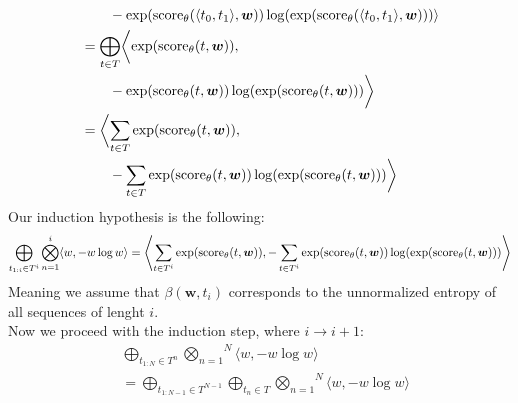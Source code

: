 \documentclass[a4paper,12pt]{ETHexercise}
\begin{document}
\begin{question}
\begin{subquestion}
\begin{align}
			                                                                                       & \qquad -\exp(\text{score}_{\theta}(\langle t_0, t_1 \rangle, \boldsymbol{w})) \log(\exp(\text{score}_{\theta}(\langle t_0, t_1 \rangle, \boldsymbol{w}))) \rangle               \\
			                                                                                       & = \bigoplus_{t \in T} \biggl< \exp(\text{score}_{\theta}(t, \boldsymbol{w})),                         \nonumber \\
			                                                                                       & \qquad  -\exp(\text{score}_{\theta}(t, \boldsymbol{w})) \log(\exp(\text{score}_{\theta}(t, \boldsymbol{w}))) \biggr>                          \\
			                                                                                       & = \biggl< \sum_{t \in T} \exp(\text{score}_{\theta}(t, \boldsymbol{w})),                              \nonumber \\
			                                                                                       & \qquad -\sum_{t \in T} \exp(\text{score}_{\theta}(t, \boldsymbol{w})) \log(\exp(\text{score}_{\theta}(t, \boldsymbol{w}))) \biggr>
		\end{align}
		Our induction hypothesis is the following:\\
		\begin{align}
			\bigoplus_{t_{1:i} \in T^{i}} \overset{i}{\bigotimes_{n=1}} \langle w, -w \log w \rangle = \left\langle \sum_{t \in T^{i}} \exp(\text{score}_{\theta}(t, \boldsymbol{w})), -\sum_{t \in T^{i}} \exp(\text{score}_{\theta}(t, \boldsymbol{w})) \log(\exp(\text{score}_{\theta}(t, \boldsymbol{w}))) \right\rangle
		\end{align}
		Meaning we assume that $\beta(\mathbf{w}, t_i)$ corresponds to the unnormalized entropy of all sequences of lenght $i$.\\
		Now we proceed with the induction step, where $i \rightarrow i + 1$:\\
		\begin{align}
			 & \bigoplus_{t_{1:N} \in T^{n}} \overset{N}{\bigotimes_{n=1}} \langle w, -w \log w \rangle                                                                                                                                                                                        \\
			 & = \bigoplus_{t_{1:N-1} \in T^{N-1}} \bigoplus_{t_n \in T} \overset{N}{\bigotimes_{n=1}} \langle w, -w \log w \rangle                                                                                                                                                            \\

\end{align}
\end{subquestion}
\end{question}
\end{document}
